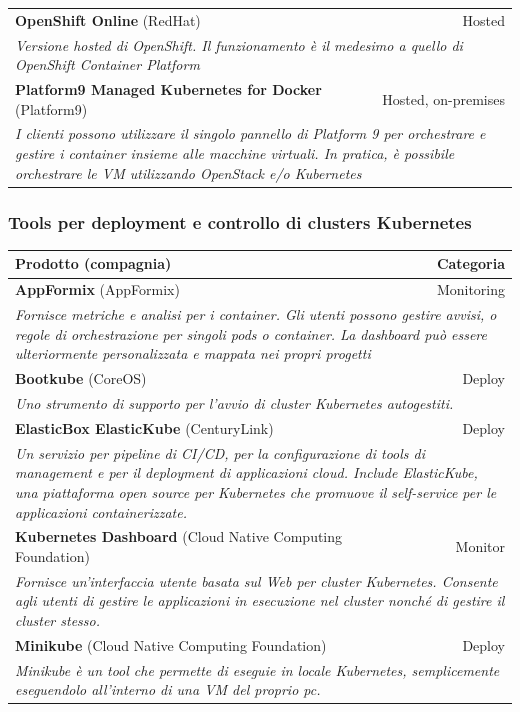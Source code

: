 \documentclass[12pt, a4paper]{report}
\begin{document}
\begin{table}[ht]
\small
\centering
\begin{tabularx}{\textwidth}{|lr|}
\hline
\textbf{OpenShift Online} (RedHat)&Hosted\\
\multicolumn{2}{|X|}{\textit{Versione hosted di OpenShift. Il funzionamento è il medesimo a quello di OpenShift Container Platform}}\\
\hline
\textbf{Platform9 Managed Kubernetes for Docker} (Platform9)&Hosted, on-premises\\
\multicolumn{2}{|X|}{\textit{I clienti possono utilizzare il singolo pannello di Platform 9 per orchestrare e gestire i container insieme alle macchine virtuali. In pratica, è possibile orchestrare le VM utilizzando OpenStack e/o Kubernetes}}\\
\hline
\end{tabularx}
\end{table}

\subsubsection{Tools per deployment e controllo di clusters Kubernetes}
\begin{table}[ht]
\small
\centering
\begin{tabularx}{\textwidth}{|lr|}
\hline
\textbf{Prodotto} (compagnia) & \textbf{Categoria}\\
\hline
\textbf{AppFormix} (AppFormix)&Monitoring\\
\multicolumn{2}{|X|}{\textit{Fornisce metriche e analisi per i container. Gli utenti possono gestire avvisi, o regole di orchestrazione per singoli pods o container. La dashboard può essere ulteriormente personalizzata e mappata nei propri progetti}}\\
\hline
\textbf{Bootkube} (CoreOS)&Deploy\\
\multicolumn{2}{|X|}{\textit{Uno strumento di supporto per l'avvio di cluster Kubernetes autogestiti.}}\\
\hline
\textbf{ElasticBox ElasticKube} (CenturyLink)&Deploy\\
\multicolumn{2}{|X|}{\textit{Un servizio per pipeline di CI/CD, per la configurazione di tools di management e per il deployment di applicazioni cloud. Include ElasticKube, una piattaforma open source per Kubernetes che promuove il self-service per le applicazioni containerizzate.}}\\
\hline
\textbf{Kubernetes Dashboard} (Cloud Native Computing Foundation)&Monitor\\
\multicolumn{2}{|X|}{\textit{Fornisce un'interfaccia utente basata sul Web per cluster Kubernetes. Consente agli utenti di gestire le applicazioni in esecuzione nel cluster nonché di gestire il cluster stesso.}}\\
\hline
\textbf{Minikube} (Cloud Native Computing Foundation)&Deploy\\
\multicolumn{2}{|X|}{\textit{Minikube è un tool che permette di eseguie in locale Kubernetes, semplicemente eseguendolo all'interno di una VM del proprio pc. }}\\
\hline
\end{tabularx}
\end{table}
\newpage
\end{document}
